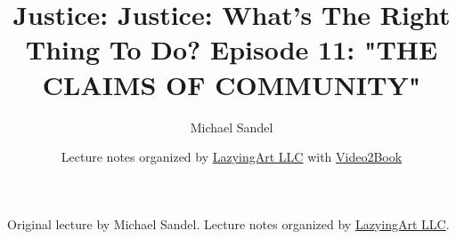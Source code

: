 \documentclass[11pt,oneside]{book}
\begin{document}
\frontmatter
\title{Justice: Justice: What's The Right Thing To Do? Episode 11: "THE CLAIMS OF COMMUNITY"}
\author{Michael Sandel}
\date{Lecture notes organized by \href{https://lazying.art}{LazyingArt LLC} with \href{https://github.com/lachlanchen/Video2Book}{Video2Book}}
\maketitle
\begin{center}
\small Original lecture by Michael Sandel. Lecture notes organized by \href{https://lazying.art}{LazyingArt LLC}.
\end{center}
\clearpage
\mainmatter

\end{document}
